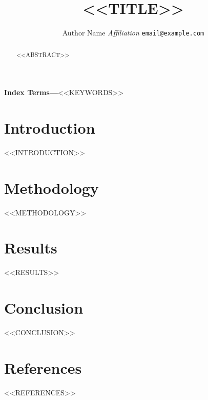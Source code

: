 \documentclass[10pt,twocolumn]{article}
\title{<<TITLE>>}
\author{Author Name \quad \textit{Affiliation} \quad \texttt{email@example.com}}
\date{}
\makeatletter
\renewcommand{\maketitle}{%
  \twocolumn[%
    \begin{@twocolumnfalse}
      \centering
      {\LARGE \bfseries \@title \par}\vspace{0.5em}
      {\normalsize \@author \par}\vspace{0.3em}
      {\small \@date \par}\vspace{1.2em}
    \end{@twocolumnfalse}
  ]%
}
\makeatother
\begin{document}
\maketitle

\begin{abstract}
\boldmath
<<ABSTRACT>>
\end{abstract}

\textbf{Index Terms---}<<KEYWORDS>>

\section{Introduction}
<<INTRODUCTION>>

\section{Methodology}
<<METHODOLOGY>>

\section{Results}
<<RESULTS>>

\section{Conclusion}
<<CONCLUSION>>

\section*{References}
\small
<<REFERENCES>>
\end{document}
